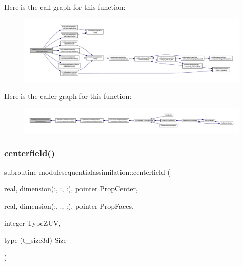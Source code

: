 Here is the call graph for this function\+:\nopagebreak
\begin{figure}[H]
\begin{center}
\leavevmode
\includegraphics[width=350pt]{namespacemodulesequentialassimilation_af08be0960351f7f29fe3b0b796b72da3_cgraph}
\end{center}
\end{figure}
Here is the caller graph for this function\+:\nopagebreak
\begin{figure}[H]
\begin{center}
\leavevmode
\includegraphics[width=350pt]{namespacemodulesequentialassimilation_af08be0960351f7f29fe3b0b796b72da3_icgraph}
\end{center}
\end{figure}
\mbox{\label{namespacemodulesequentialassimilation_a2481d2ea20d9e305e0090e324dd3893e}} 
\subsubsection{\texorpdfstring{centerfield()}{centerfield()}}
{\footnotesize\ttfamily subroutine modulesequentialassimilation\+::centerfield (\begin{DoxyParamCaption}\item[{real, dimension(\+:, \+:, \+:), pointer}]{Prop\+Center,  }\item[{real, dimension(\+:, \+:, \+:), pointer}]{Prop\+Faces,  }\item[{integer}]{Type\+Z\+UV,  }\item[{type (t\+\_\+size3d)}]{Size }\end{DoxyParamCaption})\hspace{0.3cm}{\ttfamily [private]}}

